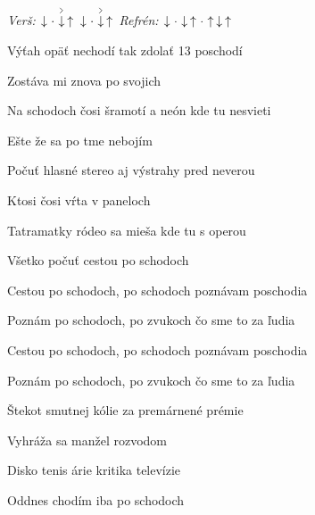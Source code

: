 \begin{song}


\begin{headerbox}
\RaiseBoxWithAccents
{} \quad
\textit{Verš:} $\Down\Miss\AccentDown\Up\ \Down\Miss\AccentDown\Up$ \quad
\textit{Refrén:} $\Down\Miss\Down\Up\Miss\Up\Down\Up$
\end{headerbox}

\begin{hchordbox}
\end{hchordbox}

\Large

\bigskip

Výťah opäť nechodí tak zdolať 13 poschodí \par
{}Zostáva mi znova po svojich \par
Na schodoch čosi šramotí a neón kde tu nesvieti \par
{}Ešte že sa po tme nebojím \par

\bigskip

Počuť hlasné stereo aj výstrahy pred neverou \par
{}Ktosi čosi vŕta v paneloch \par
{}Tatramatky ródeo sa mieša kde tu s operou \par
{}Všetko počuť cestou po schodoch \par

\bigskip

Cestou po schodoch, po schodoch poznávam poschodia \par
Poznám po schodoch, po zvukoch čo sme to za ľudia \par
Cestou po schodoch, po schodoch poznávam poschodia \par
Poznám po schodoch, po zvukoch čo sme to za ľudia \par

\bigskip

Štekot smutnej kólie za premárnené prémie \par
{}Vyhráža sa manžel rozvodom \par
{}Disko tenis árie kritika televízie \par
{}Oddnes chodím iba po schodoch \par


\end{song}
